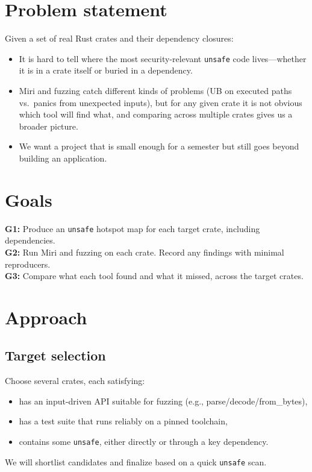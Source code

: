 \documentclass[11pt]{article}
\begin{document}
\section*{Problem statement}
Given a set of real Rust crates and their dependency closures:
\begin{itemize}[leftmargin=*]
  \item It is hard to tell where the most security-relevant \texttt{unsafe} code lives---whether it is in a crate itself or buried in a dependency.
  \item Miri and fuzzing catch different kinds of problems (UB on executed paths vs.\ panics from unexpected inputs), but for any given crate it is not obvious which tool will find what, and comparing across multiple crates gives us a broader picture.
  \item We want a project that is small enough for a semester but still goes beyond building an application.
\end{itemize}

\section*{Goals}
\textbf{G1:} Produce an \texttt{unsafe} hotspot map for each target crate, including dependencies.\\
\textbf{G2:} Run Miri and fuzzing on each crate. Record any findings with minimal reproducers.\\
\textbf{G3:} Compare what each tool found and what it missed, across the target crates.

\section*{Approach}
\subsection*{Target selection}
Choose several crates, each satisfying:
\begin{itemize}[leftmargin=*]
  \item has an input-driven API suitable for fuzzing (e.g., parse/decode/from\_bytes),
  \item has a test suite that runs reliably on a pinned toolchain,
  \item contains some \texttt{unsafe}, either directly or through a key dependency.
\end{itemize}
We will shortlist candidates and finalize based on a quick \texttt{unsafe} scan.
\end{document}
